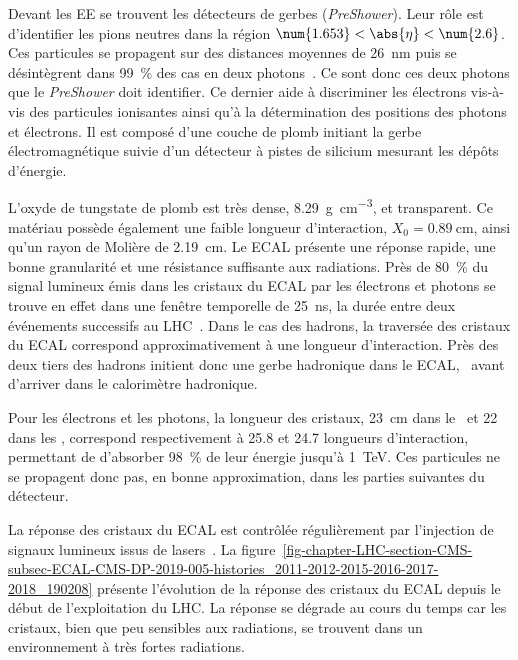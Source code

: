 \par Devant les EE se trouvent les détecteurs de gerbes (\emph{PreShower}).
Leur rôle est d'identifier les pions neutres dans la région $\num{1.653}<\abs{\eta}<\num{2.6}$.
Ces particules se propagent sur des distances moyennes de \SI{26}{\nano\meter} puis se désintègrent dans \SI{99}{\%} des cas en deux photons~\cite{PDG_booklet_2020}.
Ce sont donc ces deux photons que le \emph{PreShower} doit identifier.
Ce dernier aide à discriminer les électrons vis-à-vis des particules ionisantes ainsi qu'à la détermination des positions des photons et électrons.
Il est composé d'une couche de plomb initiant la gerbe électromagnétique suivie d'un détecteur à pistes de silicium mesurant les dépôts d'énergie.
\par L'oxyde de tungstate de plomb est très dense, \SI{8.29}{\gram.\centi\meter^{-3}}, et transparent.
Ce matériau possède également une faible longueur d'interaction, $X_0=\SI{0.89}{\centi\meter}$, ainsi qu'un rayon de Molière de \SI{2.19}{\centi\meter}.
Le ECAL présente une réponse rapide, une bonne granularité et une résistance suffisante aux radiations.
Près de \SI{80}{\%} du signal lumineux émis dans les cristaux du ECAL par les électrons et photons se trouve en effet dans une fenêtre temporelle de \SI{25}{\nano\second}, la durée entre deux événements successifs au LHC~\cite{cms_paper}.
Dans le cas des hadrons, la traversée des cristaux du ECAL correspond approximativement à une longueur d'interaction.
Près des deux tiers des hadrons initient donc une gerbe hadronique dans le ECAL, \ie\ avant d'arriver dans le calorimètre hadronique.
\par Pour les électrons et les photons, la longueur des cristaux, \SI{23}{\centi\meter} dans le \CMSbarrel\ et \num{22} dans les \CMSendcaps, correspond respectivement à \num{25.8} et \num{24.7} longueurs d'interaction, permettant de d'absorber \SI{98}{\%} de leur énergie jusqu'à \SI{1}{\TeV}.
Ces particules ne se propagent donc pas, en bonne approximation, dans les parties suivantes du détecteur.
\par La réponse des cristaux du ECAL est contrôlée régulièrement par l'injection de signaux lumineux issus de lasers~\cite{CMS-DP-2019-005}.
La figure~\ref{fig-chapter-LHC-section-CMS-subsec-ECAL-CMS-DP-2019-005-histories_2011-2012-2015-2016-2017-2018_190208} présente l'évolution de la réponse des cristaux du ECAL depuis le début de l'exploitation du LHC.
La réponse se dégrade au cours du temps car les cristaux, bien que peu sensibles aux radiations, se trouvent dans un environnement à très fortes radiations.

